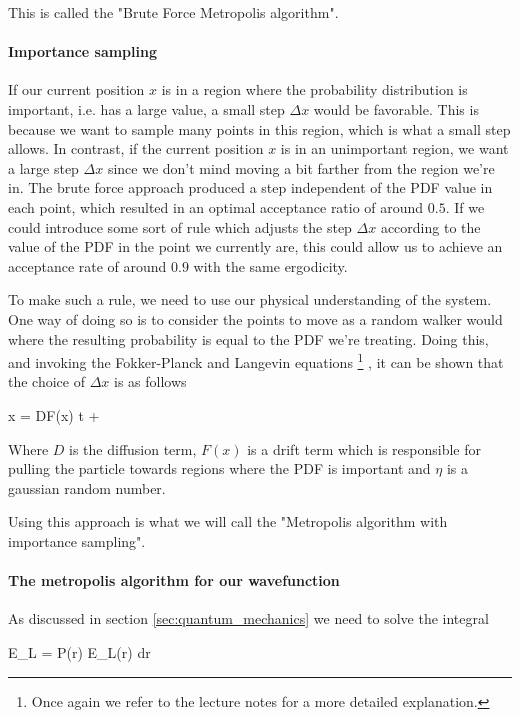 This is called the "Brute Force Metropolis algorithm". 

\paragraph{Importance sampling}

If our current position $x$ is in a region where the probability distribution is important, i.e. has a large value, a small step $\Delta x$ would be favorable. 
This is because we want to sample many points in this region, which is what a small step allows. 
In contrast, if the current position $x$ is in an unimportant region, we want a large step $\Delta x$ since we don't mind moving a bit farther from the region we're in. 
The brute force approach produced a step independent of the PDF value in each point, which resulted in an optimal acceptance ratio of around $0.5$. 
If we could introduce some sort of rule which adjusts the step $\Delta x$ according to the value of the PDF in the point we currently are, this could allow us to achieve an acceptance rate of around $0.9$ with the same ergodicity. 

To make such a rule, we need to use our physical understanding of the system. 
One way of doing so is to consider the points to move as a random walker would where the resulting probability is equal to the PDF we're treating.
Doing this, and invoking the Fokker-Planck and Langevin equations
\footnote{Once again we refer to the lecture notes \cite{lecturenotes} for a more detailed explanation.}
, it can be shown that the choice of $\Delta x$ is as follows

\eqs
\Delta x = DF(x) \delta t  + \eta 
\label{eq:importance_raw}
\eqf

Where $D$ is the diffusion term, $F(x)$ is a drift term which is responsible for pulling the particle towards regions where the PDF is important and $\eta$ is a gaussian random number.

Using this approach is what we will call the "Metropolis algorithm with importance sampling".


\paragraph{The metropolis algorithm for our wavefunction}
As discussed in section \ref{sec:quantum_mechanics} we need to solve the integral 

\eqs \langle E_L \rangle = \int P(\vec r) E_L(\vec r) d\vec r \eqf

